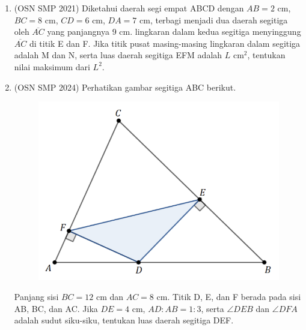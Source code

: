 \documentclass[a4paper, 12pt]{article}
\begin{document}
\begin{enumerate}
    \item (OSN SMP 2021) Diketahui daerah segi empat ABCD dengan $AB=2$ cm, $BC=8$ cm, $CD=6$ cm, $DA=7$ cm, terbagi menjadi dua daerah segitiga oleh $\overline{AC}$ yang panjangnya 9 cm. lingkaran dalam kedua segitiga menyinggung $\overline{AC}$ di titik E dan F. Jika titik pusat masing-masing lingkaran dalam segitiga adalah M dan N, serta luas daerah segitiga EFM adalah $L \text{ cm}^{2}$, tentukan nilai maksimum dari $L^{2}$.



        \item (OSN SMP 2024) Perhatikan gambar segitiga ABC berikut.
    \begin{figure}[H]
    \centering
    \includegraphics[scale=0.5]{0Figure/osn-smp-2024-3.png}
    \end{figure}
    Panjang sisi $BC=12$ cm dan $AC=8$ cm. Titik D, E, dan F berada pada sisi AB, BC, dan AC. Jika $DE=4$ cm, $AD:AB=1:3$, serta $\angle DEB$ dan $\angle DFA$ adalah sudut siku-siku, tentukan luas daerah segitiga DEF.


\end{enumerate}
\end{document}
